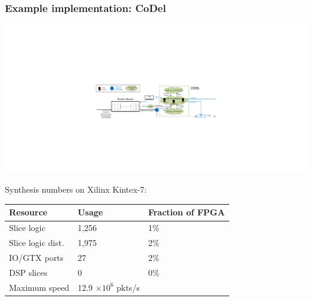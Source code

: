 \begin{frame}[plain]
\frametitle{Example implementation: CoDel}
\begin{center}
\includegraphics[width=\columnwidth]{codel.pdf}
\end{center}
\begin{center}
Synthesis numbers on Xilinx Kintex-7: \\
\begin{tabular}{lll}
\bf Resource & \bf Usage & \bf Fraction of FPGA \\
\hline Slice logic & 1,256 & 1\% \\
Slice logic dist. & 1,975 & 2\% \\
IO/GTX ports & 27 & 2\% \\
DSP slices & 0 & 0\% \\
Maximum speed & 12.9 $\times 10^6$ pkts/s \\
\end{tabular}
\end{center}
\end{frame}


